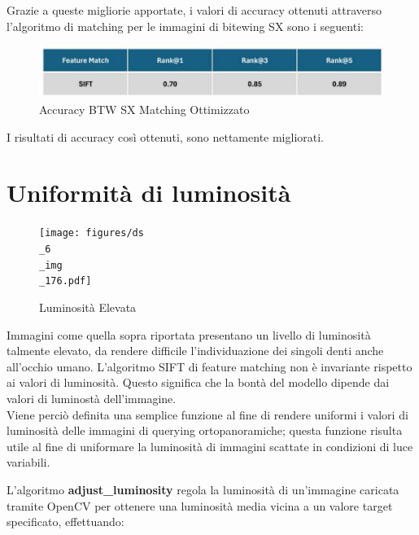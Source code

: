 \documentclass[12pt,a4paper,openright,twoside]{book}
\begin{document}
Grazie a queste migliorie apportate, i valori di accuracy ottenuti attraverso l'algoritmo di matching per le immagini di bitewing SX sono i seguenti:
\begin{figure}[H]
	\centering
	\includegraphics{figures/sx9.pdf}
    	\caption{Accuracy BTW SX Matching Ottimizzato}
	\label{fig:sx9}
\end{figure}
I risultati di accuracy così ottenuti, sono nettamente migliorati.
\section{Uniformità di luminosità}
\begin{figure}[H]
	\centering
	\texttt{[image: figures/ds\\\_6\\\_img\\\_176.pdf]}
    	\caption{Luminosità Elevata}
	\label{fig:luminosità}
\end{figure}
Immagini come quella sopra riportata presentano un livello di luminosità talmente elevato, da rendere difficile l'individuazione dei singoli denti anche all'occhio umano. L'algoritmo SIFT di feature matching non è invariante rispetto ai valori di luminosità. Questo significa che la bontà del modello dipende dai valori di luminostà dell'immagine.\\
Viene perciò definita una semplice funzione al fine di rendere uniformi i valori di luminosità delle immagini di querying ortopanoramiche; questa funzione risulta utile al fine di uniformare la luminosità di immagini scattate in condizioni di luce variabili.
\begin{figure}[H]
    \centering
    
\end{figure}
L'algoritmo \textbf{adjust\_luminosity} regola la luminosità di un'immagine caricata tramite OpenCV per ottenere una luminosità media vicina a un valore target specificato, effettuando:
\end{document}

